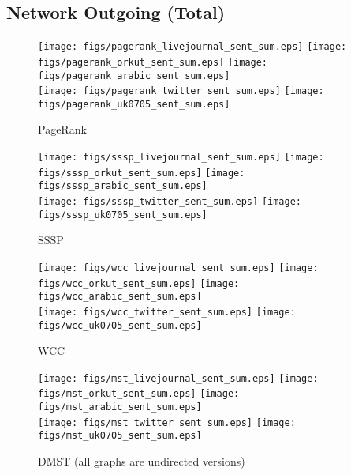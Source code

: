 \documentclass{article}
\newcommand{\bline}[1][1]{\vspace{#1\baselineskip}}
\begin{document}
\pagebreak
\subsection{Network Outgoing (Total)}
\begin{figure}[!h]
  \bline[1]
  \centering
  \texttt{[image: figs/pagerank\_livejournal\_sent\_sum.eps]}\hspace{1em}%
  \texttt{[image: figs/pagerank\_orkut\_sent\_sum.eps]}\hspace{1em}%
  \texttt{[image: figs/pagerank\_arabic\_sent\_sum.eps]}\\
  \texttt{[image: figs/pagerank\_twitter\_sent\_sum.eps]}\hspace{1em}%
  \texttt{[image: figs/pagerank\_uk0705\_sent\_sum.eps]}
  \caption{PageRank}
\end{figure}

\begin{figure}[!h]
  \bline[3.5]
  \centering
  \texttt{[image: figs/sssp\_livejournal\_sent\_sum.eps]}\hspace{1em}%
  \texttt{[image: figs/sssp\_orkut\_sent\_sum.eps]}\hspace{1em}%
  \texttt{[image: figs/sssp\_arabic\_sent\_sum.eps]}\\
  \texttt{[image: figs/sssp\_twitter\_sent\_sum.eps]}\hspace{1em}%
  \texttt{[image: figs/sssp\_uk0705\_sent\_sum.eps]}
  \caption{SSSP}
\end{figure}

\begin{figure}[!h]
  \bline[3.5]
  \centering
  \texttt{[image: figs/wcc\_livejournal\_sent\_sum.eps]}\hspace{1em}%
  \texttt{[image: figs/wcc\_orkut\_sent\_sum.eps]}\hspace{1em}%
  \texttt{[image: figs/wcc\_arabic\_sent\_sum.eps]}\\
  \texttt{[image: figs/wcc\_twitter\_sent\_sum.eps]}\hspace{1em}%
  \texttt{[image: figs/wcc\_uk0705\_sent\_sum.eps]}
  \caption{WCC}
\end{figure}

\begin{figure}[!h]
  \bline[3.5]
  \centering
  \texttt{[image: figs/mst\_livejournal\_sent\_sum.eps]}\hspace{1em}%
  \texttt{[image: figs/mst\_orkut\_sent\_sum.eps]}\hspace{1em}%
  \texttt{[image: figs/mst\_arabic\_sent\_sum.eps]}\\
  \texttt{[image: figs/mst\_twitter\_sent\_sum.eps]}\hspace{1em}%
  \texttt{[image: figs/mst\_uk0705\_sent\_sum.eps]}
  \caption{DMST (all graphs are undirected versions)}
\end{figure}
\end{document}
